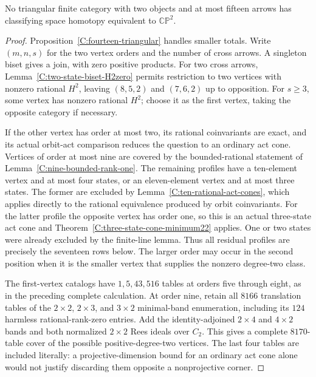 \begin{proposition}
\label{C:fifteen-triangular}
No triangular finite category with two objects and at most fifteen
arrows has classifying space homotopy equivalent to $\mathbb{CP}^2$.
\end{proposition}
\begin{proof}
Proposition~\ref{C:fourteen-triangular} handles smaller totals.
Write $(m,n,s)$ for the two vertex orders and the number of cross
arrows.  A singleton biset gives a join, with zero positive
products.  For two cross arrows,
Lemma~\ref{C:two-state-biset-H2zero} permits restriction to
two vertices with nonzero rational $H^2$, leaving $(8,5,2)$
and $(7,6,2)$ up to opposition.
For $s\geq3$, some vertex has nonzero rational $H^2$; choose
it as the first vertex, taking the opposite category if necessary.

If the other vertex has order at most two, its rational
coinvariants are exact, and its actual orbit-act comparison
reduces the question to an ordinary act cone.  Vertices of order
at most nine are covered by the bounded-rational statement of
Lemma~\ref{C:nine-bounded-rank-one}.
The remaining profiles have a ten-element vertex and at most
four states, or an eleven-element vertex and at most three states.
The former are excluded by Lemma~\ref{C:ten-rational-act-cones},
which applies directly to the rational equivalence produced by
orbit coinvariants.  For the latter profile the opposite vertex
has order one, so this is an actual three-state act cone and
Theorem~\ref{C:three-state-cone-minimum22} applies.
One or two states were already excluded by the finite-line lemma.
Thus all residual profiles are precisely the seventeen rows below.
The larger order may occur in the second position when it is
the smaller vertex that supplies the nonzero degree-two class.

The first-vertex catalogs have $1,5,43,516$ tables at orders
five through eight, as in the preceding complete calculation.
At order nine, retain all $8166$ translation tables of the
$2\times2$, $2\times3$, and $3\times2$ minimal-band enumeration,
including its $124$ harmless rational-rank-zero entries.  Add
the identity-adjoined $2\times4$ and $4\times2$ bands and both
normalized $2\times2$ Rees ideals over $C_2$.  This gives a
complete $8170$-table cover of the possible positive-degree-two
vertices.  The last four tables are included literally: a
projective-dimension bound for an ordinary act cone alone would
not justify discarding them opposite a nonprojective corner.


\end{proof}
